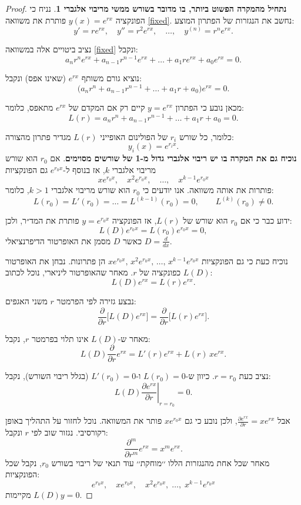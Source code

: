 \documentclass{article}
\numberwithin{equation}{section}
\begin{document}
\begin{proof}
\textbf{
נתחיל מהמקרה הפשוט ביותר, בו מדובר בשורש ממשי מריבוי אלגברי 1}.
נניח כי הפונקציה $y(x)=e^{rx}$ פותרת את משוואה \ref{fixed}.
נחשב את הנגזרות של הפתרון המוצע:
\[
y' = r e^{rx}, \quad y'' = r^2 e^{rx}, \quad \dots, \quad y^{(n)} = r^n e^{rx}.
\]

נציב ביטויים אלה במשוואה \ref{fixed} ונקבל:
\[
a_n r^n e^{rx} + a_{n-1} r^{n-1} e^{rx} + \dots + a_1 r e^{rx} + a_0 e^{rx} = 0.
\]

נוציא גורם משותף $e^{rx}$ (שאינו אפס) ונקבל:
\[
\big(a_n r^n + a_{n-1} r^{n-1} + \dots + a_1 r + a_0 \big) e^{rx} = 0.
\]

מכאן נובע כי הפתרון $y=e^{rx}$ קיים רק אם המקדם של $e^{rx}$ מתאפס, כלומר:
\[
L(r) = a_n r^n + a_{n-1} r^{n-1} + \dots + a_1 r + a_0 = 0.
\]

כלומר, כל שורש $r_i$ של הפולינום האופייני $L(r)$ מגדיר פתרון מהצורה:
\[
y_i(x) = e^{r_i x}.
\]
\textbf{
נוכיח גם את המקרה בו יש ריבוי אלגברי גדול מ-1 של שורשים מסוימים}.
אם $r_0$ הוא שורש מריבוי אלגברי $k$, אז בנוסף ל-$e^{r_0 x}$ גם הפונקציות
\[
x e^{r_0 x}, \quad x^2 e^{r_0 x}, \quad \dots, \quad x^{k-1} e^{r_0 x}
\]
פותרות את אותה משוואה.
אנו יודעים כי $r_0$ הוא שורש מריבוי אלגברי $k>1$, כלומר:
\[
L(r_0) = L'(r_0) = \dots = L^{(k-1)}(r_0) = 0, \qquad L^{(k)}(r_0) \neq 0.
\]

ידוע כבר כי אם $r_0$ הוא שורש של $L(r)$, אז הפונקציה $y=e^{r_0 x}$ פותרת את המד״ר, ולכן:
\begin{equation}
L(D)e^{r_0 x} = L(r_0)e^{r_0 x} = 0,
\end{equation}
כאשר $D$ מסמן את האופרטור הדיפרנציאלי $D=\tfrac{d}{dx}$.

נוכיח כעת כי גם הפונקציות $x e^{r_0 x},\, x^2 e^{r_0 x},\, \dots,\, x^{k-1} e^{r_0 x}$ הן פתרונות.  
נבחן את האופרטור $L(D)$ כפונקציה של $r$.  
מאחר שהאופרטור ליניארי, נוכל לכתוב:
\[
L(D)e^{rx} = L(r)e^{rx}.
\]

נבצע גזירה לפי הפרמטר $r$ משני האגפים:
\[
\frac{\partial}{\partial r}\big[L(D)e^{rx}\big]
= \frac{\partial}{\partial r}\big[L(r)e^{rx}\big].
\]

מאחר ש-$L(D)$ אינו תלוי בפרמטר $r$, נקבל:
\[
L(D)\frac{\partial}{\partial r}e^{rx} = L'(r)e^{rx} + L(r)\,x e^{rx}.
\]

נציב כעת $r=r_0$.  
כיוון ש-$L(r_0)=0$ ו-$L'(r_0)=0$ (בגלל ריבוי השורש), נקבל:
\[
L(D)\left.\frac{\partial e^{rx}}{\partial r}\right|_{r=r_0} = 0.
\]

אבל $\frac{\partial e^{rx}}{\partial r} = x e^{rx}$, ולכן נובע כי גם $x e^{r_0 x}$ פותר את המשוואה.
נוכל לחזור על התהליך באופן רקורסיבי.  
נגזור שוב לפי $r$ ונקבל:
\[
\frac{\partial^m}{\partial r^m} e^{rx} = x^m e^{rx}.
\]
מאחר שכל אחת מהנגזרות הללו ׳׳מוחקת׳׳ עוד תנאי של ריבוי בשורש $r_0$, נקבל שכל הפונקציות:
\[
e^{r_0 x}, \quad x e^{r_0 x}, \quad x^2 e^{r_0 x}, \; \dots, \; x^{k-1} e^{r_0 x}
\]
מקיימות $L(D)y=0$.


\end{proof}
\end{document}
